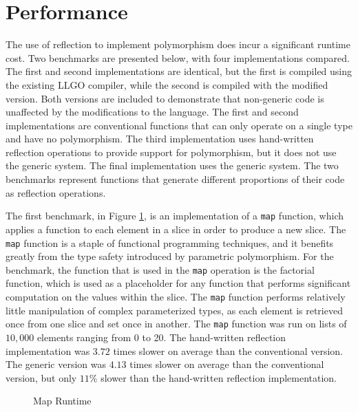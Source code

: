 \documentclass[letterpaper,twocolumn,11pt]{article}
\begin{document}
\section{Performance} \label{results}

The use of reflection to implement polymorphism does incur a significant runtime cost. Two benchmarks are presented below, with four implementations compared. The first and second implementations are identical, but the first is compiled using the existing LLGO compiler, while the second is compiled with the modified version. Both versions are included to demonstrate that non-generic code is unaffected by the modifications to the language. The first and second implementations are conventional functions that can only operate on a single type and have no polymorphism. The third implementation uses hand-written reflection operations to provide support for polymorphism, but it does not use the generic system. The final implementation uses the generic system. The two benchmarks represent functions that generate different proportions of their code as reflection operations. 

The first benchmark, in Figure \ref{fig:map}, is an implementation of a \texttt{map} function, which applies a function to each element in a slice in order to produce a new slice. The \texttt{map} function is a staple of functional programming techniques, and it benefits greatly from the type safety introduced by parametric polymorphism. For the benchmark, the function that is used in the \texttt{map} operation is the factorial function, which is used as a placeholder for any function that performs significant computation on the values within the slice. The \texttt{map} function performs relatively little manipulation of complex parameterized types, as each element is retrieved once from one slice and set once in another. The \texttt{map} function was run on lists of $10,000$ elements ranging from 0 to 20. The hand-written reflection implementation was $3.72$ times slower on average than the conventional version. The generic version was $4.13$ times slower on average than the conventional version, but only $11\%$ slower than the hand-written reflection implementation.

\begin{figure}
    \caption{Map Runtime\label{fig:map}}
    \centering
    
\end{figure}
\end{document}
